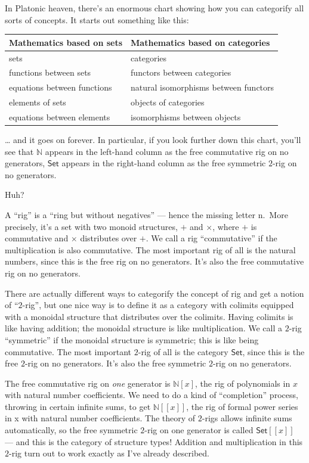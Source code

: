 \documentclass{article}
\begin{document}
In Platonic heaven, there's an enormous chart showing how you can
categorify all sorts of concepts. It starts out something like this:

\begin{longtable}[]{@{}ll@{}}
\toprule
\textbf{Mathematics based on sets} & \textbf{Mathematics based on
categories}\tabularnewline
\midrule
\endhead
sets & categories\tabularnewline
functions between sets & functors between categories\tabularnewline
equations between functions & natural isomorphisms between
functors\tabularnewline
elements of sets & objects of categories\tabularnewline
equations between elements & isomorphisms between objects\tabularnewline
\bottomrule
\end{longtable}

\ldots{} and it goes on forever. In particular, if you look further down
this chart, you'll see that \(\mathbb{N}\) appears in the left-hand
column as the free commutative rig on no generators, \(\mathsf{Set}\)
appears in the right-hand column as the free symmetric \(2\)-rig on no
generators.

Huh?

A ``rig'' is a ``ring but without negatives'' --- hence the missing
letter n.~More precisely, it's a set with two monoid structures, \(+\)
and \(\times\), where \(+\) is commutative and \(\times\) distributes
over \(+\). We call a rig ``commutative'' if the multiplication is also
commutative. The most important rig of all is the natural numbers, since
this is the free rig on no generators. It's also the free commutative
rig on no generators.

There are actually different ways to categorify the concept of rig and
get a notion of ``\(2\)-rig'', but one nice way is to define it as a
category with colimits equipped with a monoidal structure that
distributes over the colimits. Having colimits is like having addition;
the monoidal structure is like multiplication. We call a \(2\)-rig
``symmetric'' if the monoidal structure is symmetric; this is like being
commutative. The most important \(2\)-rig of all is the category
\(\mathsf{Set}\), since this is the free \(2\)-rig on no generators.
It's also the free symmetric \(2\)-rig on no generators.

The free commutative rig on \emph{one} generator is \(\mathbb{N}[x]\),
the rig of polynomials in \(x\) with natural number coefficients. We
need to do a kind of ``completion'' process, throwing in certain
infinite sums, to get \(\mathbb{N}[[x]]\), the rig of formal power
series in x with natural number coefficients. The theory of \(2\)-rigs
allows infinite sums automatically, so the free symmetric \(2\)-rig on
one generator is called \(\mathsf{Set}[[x]]\) --- and this is the
category of structure types! Addition and multiplication in this
\(2\)-rig turn out to work exactly as I've already described.
\end{document}
